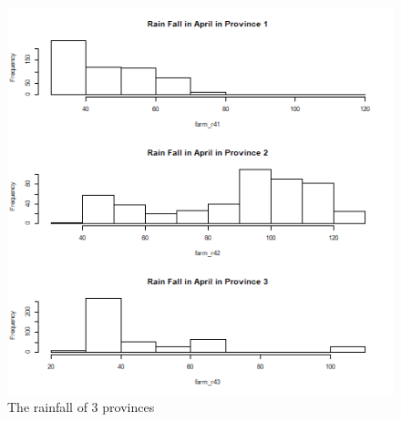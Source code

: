 \documentclass[12pt, a4paper]{article}
\begin{document}
\begin{figure}[h]
\centering
\includegraphics[scale=.5]{rain4.png}
\caption{The rainfall of 3 provinces}
\end{figure}
\end{document}
